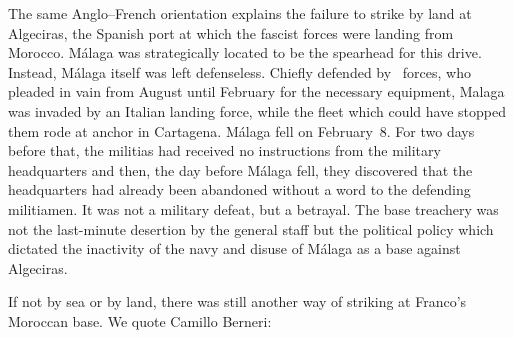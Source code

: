 \indexCNT{}
The same Anglo--French orientation explains the failure to strike by land at Algeciras, the Spanish port at which the fascist forces were landing from Morocco. M\'alaga was strategically located to be the spearhead for this drive. Instead, M\'alaga itself was left defenseless. Chiefly defended by \CNT\ forces, who pleaded in vain from August until February for the necessary equipment, Malaga was invaded by an Italian landing force, while the fleet which could have stopped them rode at anchor in Cartagena. M\'alaga fell on February~8. For two days before that, the militias had received no instructions from the military headquarters and then, the day before M\'alaga fell, they discovered that the headquarters had already been abandoned without a word to the defending militiamen. It was not a military defeat, but a betrayal. The base treachery was not the last-minute desertion by the general staff but the political policy which dictated the inactivity of the navy and disuse of M\'alaga as a base against Algeciras.%

\medskip

If not by sea or by land, there was still another way of striking at Franco’s Moroccan base. We quote Camillo Berneri:

